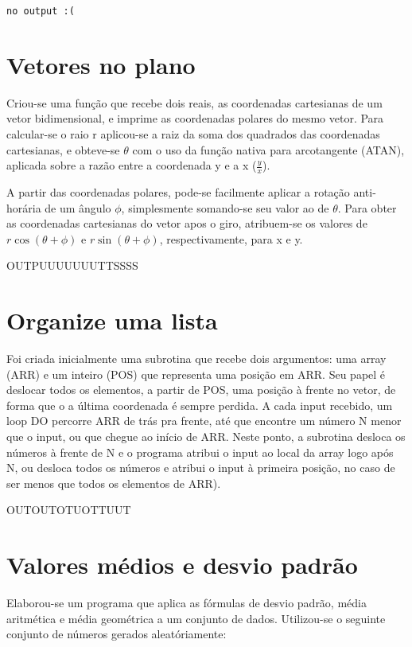 \documentclass{article}
\begin{document}
\begin{lstlisting}
no output :(
\end{lstlisting}

\section{Vetores no plano}

Criou-se uma função que recebe dois reais, as coordenadas cartesianas de um vetor bidimensional, e imprime as coordenadas polares do mesmo vetor. Para calcular-se o raio r aplicou-se a raiz da soma dos quadrados das coordenadas cartesianas, e obteve-se $\theta$ com o uso da função nativa para arcotangente (ATAN), aplicada sobre a razão entre a coordenada y e a x ($\frac{y}{x}$).\par
A partir das coordenadas polares, pode-se facilmente aplicar a rotação anti-horária de um ângulo $\phi$, simplesmente somando-se seu valor ao de $\theta$. Para obter as coordenadas cartesianas do vetor apos o giro, atribuem-se os valores de $r\cos{(\theta + \phi)}$ e $r\sin{(\theta + \phi)}$, respectivamente, para x e y.

OUTPUUUUUUUTTSSSS

\section{Organize uma lista}

Foi criada inicialmente uma subrotina que recebe dois argumentos: uma array (ARR) e um inteiro (POS) que representa uma posição em ARR. Seu papel é deslocar todos os elementos, a partir de POS, uma posição à frente no vetor, de forma que o a última coordenada é sempre perdida. A cada input recebido, um loop DO percorre ARR de trás pra frente, até que encontre um número N menor que o input, ou que chegue ao início de ARR. Neste ponto, a subrotina desloca os números à frente de N e o programa atribui o input ao local da array logo após N, ou desloca todos os números e atribui o input à primeira posição, no caso de ser menos que todos os elementos de ARR).

OUTOUTOTUOTTUUT

\section{Valores médios e desvio padrão}

Elaborou-se um programa que aplica as fórmulas de desvio padrão, média aritmética e média geométrica a um conjunto de dados.
Utilizou-se o seguinte conjunto de números gerados aleatóriamente:
\end{document}
